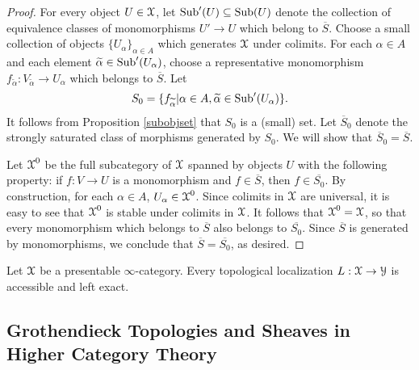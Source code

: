 \begin{proof}
For every object $U \in \operatorname{\mathcal{X}}$, let $\operatorname{Sub}'(U) \subseteq \operatorname{Sub}(U)$ denote the collection of equivalence classes of monomorphisms $U' \rightarrow U$ which belong to $\overline{S}$.
Choose a small collection of objects $\{ U_{\alpha} \}_{\alpha \in A}$ which generates $\operatorname{\mathcal{X}}$ under colimits. For each $\alpha \in A$ and each element
$\widetilde{\alpha} \in \operatorname{Sub}'(U_{\alpha})$, choose a representative monomorphism $f_{\widetilde{\alpha}}: V_{\widetilde{\alpha}} \rightarrow U_{\alpha}$ which belongs to $\overline{S}$. Let 
$$S_0 = \{ f_{\widetilde{\alpha}} | \alpha \in A, \widetilde{\alpha} \in \operatorname{Sub}'(U_{\alpha}) \}.$$
It follows from Proposition \ref{subobjset} that $S_0$ is a (small) set. Let $\overline{S}_0$ denote the strongly saturated class of morphisms generated by $S_0$. We will show that $\overline{S}_0 = \overline{S}$.

Let $\operatorname{\mathcal{X}}^{0}$ be the full subcategory of $\operatorname{\mathcal{X}}$ spanned by objects $U$ with the following property: if $f: V \rightarrow U$ is a monomorphism and $f \in \overline{S}$, then $f \in \overline{S_0}$. By construction, for each $\alpha \in A$, $U_{\alpha} \in \operatorname{\mathcal{X}}^{0}$. 
Since colimits in $\operatorname{\mathcal{X}}$ are universal, it is easy to see that $\operatorname{\mathcal{X}}^{0}$ is stable under colimits in $\operatorname{\mathcal{X}}$. It follows that $\operatorname{\mathcal{X}}^{0} = \operatorname{\mathcal{X}}$, so that every monomorphism which belongs to $\overline{S}$ also belongs to $\overline{S_0}$. Since $\overline{S}$ is generated by monomorphisms, we conclude that $\overline{S} = \overline{S_0}$, as desired.
\end{proof}

\begin{corollary}\label{topaccess}
Let $\operatorname{\mathcal{X}}$ be a presentable $\infty$-category. Every topological localization $L: \operatorname{\mathcal{X}} \rightarrow \operatorname{\mathcal{Y}}$ is accessible and left exact. 
\end{corollary}

\subsection{Grothendieck Topologies and Sheaves in Higher Category Theory}\label{cough}


